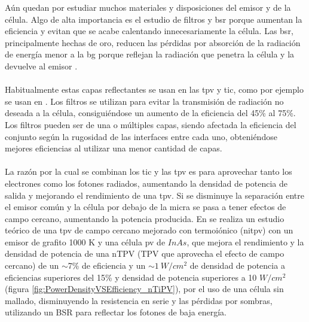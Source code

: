 Aún quedan por estudiar muchos materiales y disposiciones del emisor y de la célula. Algo de alta importancia es el estudio de filtros y \acrshort{bsr} porque aumentan la eficiencia y evitan que se acabe calentando innecesariamente la célula. Las \acrshort{bsr}, principalmente hechas de oro, reducen las pérdidas por absorción de la radiación de energía menor a la \acrshort{bg} porque reflejan la radiación que penetra la célula y la devuelve al emisor \cite{nTPV_Review}.\\\\
Habitualmente estas capas reflectantes se usan en las \acrshort{tpv} y \acrshort{tic}, como por ejemplo se usan en \cite{thermoionic_TPV_NF,modelEfficiency_NF_TPV,thermophotovoltaic_40}. Los filtros se utilizan para evitar la transmisión de radiación no deseada a la célula, consiguiéndose un aumento de la eficiencia del 45\% al 75\%. Los filtros pueden ser de una o múltiples capas, siendo afectada la eficiencia del conjunto según la rugosidad de las interfaces entre cada uno, obteniéndose mejores eficiencias al utilizar una menor cantidad de capas\cite{multiLayerFilters}.\\\\
La razón por la cual se combinan los \acrshort{tic} y las \acrshort{tpv} es para aprovechar tanto los electrones como los fotones radiados, aumentando la densidad de potencia de salida y mejorando el rendimiento de una \acrshort{tpv}. Si se disminuye la separación entre el emisor común y la célula por debajo de la micra se pasa a tener efectos de campo cercano, aumentando la potencia producida. En \cite{thermoionic_TPV_NF} se realiza un estudio teórico de una \acrshort{tpv} de campo cercano mejorado con termoiónico (\acrshort{nitpv}) con un emisor de grafito 1000 K y una célula \acrshort{pv} de $InAs$, que mejora el rendimiento y la densidad de potencia de una nTPV (TPV que aprovecha el efecto de campo cercano) de un $\sim$7\% de eficiencia y un $\sim 1 \ W/cm^{2}$ de densidad de potencia a eficiencias superiores del 15\% y densidad de potencia superiores a 10 $W/cm^{2}$ (figura \ref{fig:PowerDensityVSEfficiency_nTiPV}), por el uso de una célula sin mallado, disminuyendo la resistencia en serie y las pérdidas por sombras, utilizando un BSR para reflectar los fotones de baja energía.\\
